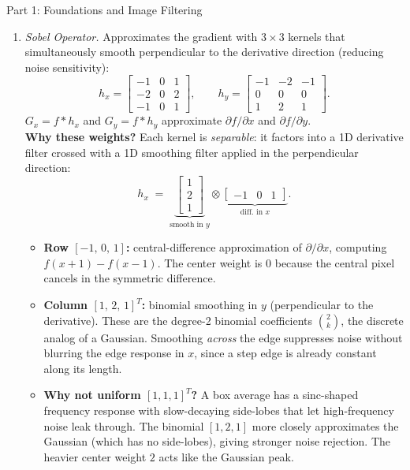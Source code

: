 \documentclass[letterpaper]{article}
\begin{document}
\begin{notes}{Part 1: Foundations and Image Filtering}
\begin{enumerate}
    \item \textit{Sobel Operator.} Approximates the gradient with $3\times3$ kernels that simultaneously smooth perpendicular to the derivative direction (reducing noise sensitivity):
    $$h_x = \begin{bmatrix}-1&0&1\\-2&0&2\\-1&0&1\end{bmatrix}, \qquad h_y = \begin{bmatrix}-1&-2&-1\\0&0&0\\1&2&1\end{bmatrix}.$$
    $G_x = f * h_x$ and $G_y = f * h_y$ approximate $\partial f/\partial x$ and $\partial f/\partial y$.\\

    \textbf{Why these weights?} Each kernel is \emph{separable}: it factors into a 1D derivative filter crossed with a 1D smoothing filter applied in the perpendicular direction:
    $$h_x \;=\; \underbrace{\begin{bmatrix}1\\2\\1\end{bmatrix}}_{\text{smooth in }y} \otimes \underbrace{\begin{bmatrix}-1 & 0 & 1\end{bmatrix}}_{\text{diff.\ in }x}.$$
    \begin{itemize}
        \item \textbf{Row $[-1,\,0,\,1]$:} central-difference approximation of $\partial/\partial x$, computing $f(x{+}1)-f(x{-}1)$. The center weight is $0$ because the central pixel cancels in the symmetric difference.
        \item \textbf{Column $[1,\,2,\,1]^T$:} binomial smoothing in $y$ (perpendicular to the derivative). These are the degree-2 binomial coefficients $\binom{2}{k}$, the discrete analog of a Gaussian. Smoothing \emph{across} the edge suppresses noise without blurring the edge response in $x$, since a step edge is already constant along its length.
        \item \textbf{Why not uniform $[1,1,1]^T$?} A box average has a sinc-shaped frequency response with slow-decaying side-lobes that let high-frequency noise leak through. The binomial $[1,2,1]$ more closely approximates the Gaussian (which has no side-lobes), giving stronger noise rejection. The heavier center weight $2$ acts like the Gaussian peak.
    \end{itemize}


\end{enumerate}
\end{notes}
\end{document}
